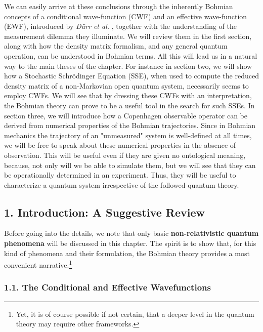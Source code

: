 \documentclass[11pt, a4paper]{article} %
\begin{document}
We can easily arrive at these conclusions through the inherently Bohmian concepts of a conditional wave-function (CWF) and an effective wave-function (EWF), introduced by {\em Dürr et al.} \cite{Absolute}, together with the understanding of the measurement dilemma they illuminate. We will review them in the first section, along with how the density matrix formalism, and any general quantum operation, can be understood in Bohmian terms. All this will lead us in a natural way to the main theses of the chapter. For instance in section two, we will show how a Stochastic Schrödinger Equation (SSE), when used to compute the reduced density matrix of a non-Markovian open quantum system, necessarily seems to employ CWFs. We will see that by dressing these CWFs with an interpretation, the Bohmian theory can prove to be a useful tool in the search for such SSEs. In section three, we will introduce how a Copenhagen observable operator can be derived from numerical properties of the Bohmian trajectories. Since in Bohmian mechanics the trajectory of an "unmeasured" system is well-defined at all times, we will be free to speak about these numerical properties in the absence of observation. This will be useful even if they are given no ontological meaning, because, not only will we be able to simulate them, but we will see that they can be operationally determined in an experiment. Thus, they will be useful to characterize a quantum system irrespective of the followed quantum theory. \vspace{-0.2cm}


\subsection*{1. Introduction: A Suggestive Review}
\vspace{-0.2cm}

Before going into the details, we note that only basic {\bf non-relativistic quantum phenomena} will be discussed in this chapter. The spirit is to show that, for this kind of phenomena and their formulation, the Bohmian theory provides a most convenient narrative.\footnote{Yet, it is of course possible if not certain, that a deeper level in the quantum theory may require other frameworks.}\vspace{-0.3cm}

\subsubsection*{1.1. The Conditional and Effective Wavefunctions}
\vspace{-0.2cm}
\end{document}
